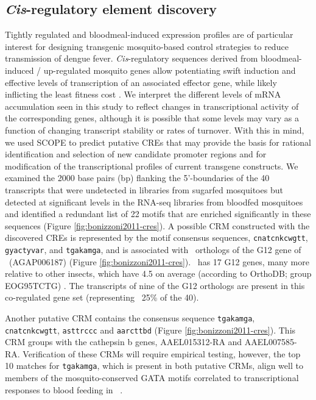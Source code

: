 \subsection{\textit{Cis}-regulatory element discovery}
Tightly regulated and bloodmeal-induced expression profiles are of particular interest for designing transgenic mosquito-based control strategies to reduce transmission of dengue fever. \textit{Cis}-regulatory sequences derived from bloodmeal-induced / up-regulated mosquito genes allow potentiating swift induction and effective levels of transcription of an associated effector gene, while likely inflicting the least fitness cost \cite{Marelli2006,Amenya2010}. We interpret the different levels of mRNA accumulation seen in this study to reflect changes in transcriptional activity of the corresponding genes, although it is possible that some levels may vary as a function of changing transcript stability or rates of turnover. With this in mind, we used \gls{SCOPE} \cite{Carlson2007} to predict putative \glspl{CRE} that may provide the basis for rational identification and selection of new candidate promoter regions and for modification of the transcriptional profiles of current transgene constructs. We examined the 2000 base pairs (bp) flanking the 5'-boundaries of the 40 transcripts that were undetected in libraries from sugarfed mosquitoes but detected at significant levels in the RNA-seq libraries from bloodfed mosquitoes and identified a redundant list of 22 motifs that are enriched significantly in these sequences (Figure \ref{fig:bonizzoni2011-cres}). A possible \gls{CRM} constructed with the discovered \glspl{CRE} is represented by the motif consensus sequences, \texttt{cnatcnkcwgtt}, \texttt{gyactyvar}, and \texttt{tgakamga}, and is associated with \Aa\  orthologs of the G12 gene of \Ag\ (AGAP006187) (Figure \ref{fig:bonizzoni2011-cres}). \Aa\ has 17 G12 genes, many more relative to other insects, which have 4.5 on average (according to OrthoDB; group EOG95TCTG) \cite{Kriventseva2008}. The transcripts of nine of the G12 orthologs are present in this co-regulated gene set (representing ~25\% of the 40).

Another putative \gls{CRM} contains the consensus sequence \texttt{tgakamga}, \texttt{cnatcnkcwgtt}, \texttt{asttrccc} and \texttt{aarcttbd} (Figure \ref{fig:bonizzoni2011-cres}). This \gls{CRM} groups with the cathepsin b genes, AAEL015312-RA and AAEL007585-RA. Verification of these \glspl{CRM} will require empirical testing, however, the top 10 matches for \texttt{tgakamga}, which is present in both putative \glspl{CRM}, align well to members of the mosquito-conserved GATA motifs correlated to transcriptional responses to blood feeding in \Ag\ \cite{Sieglaff2009}.





